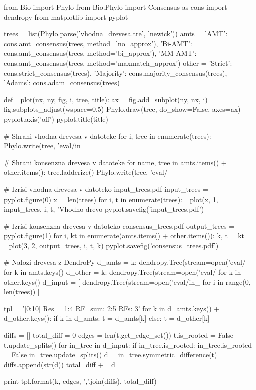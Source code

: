 \documentclass[a4paper, 12pt]{book}
\begin{document}
\begin{python}
from Bio import Phylo
from Bio.Phylo import Consensus as cons
import dendropy
from matplotlib import pyplot

trees = list(Phylo.parse('vhodna_drevesa.tre', 'newick'))
amts = {
    'AMT': cons.amt_consensus(trees, method='no_approx'),
    'Bi-AMT': cons.amt_consensus(trees, method='bi_approx'),
    'MM-AMT': cons.amt_consensus(trees, method='maxmatch_approx')
}
other = {
    'Strict': cons.strict_consensus(trees),
    'Majority': cons.majority_consensus(trees),
    'Adams': cons.adam_consensus(trees)
}

def _plot(nx, ny, fig, i, tree, title):
    ax = fig.add_subplot(ny, nx, i)
    fig.subplots_adjust(wspace=0.5)
    Phylo.draw(tree, do_show=False, axes=ax)
    pyplot.axis('off')
    pyplot.title(title)

# Shrani vhodna drevesa v datoteke
for i, tree in enumerate(trees):
    Phylo.write(tree, 'eval/in_%

# Shrani konsenzna drevesa v datoteke
for name, tree in amts.items() + other.items():
    tree.ladderize()
    Phylo.write(tree, 'eval/%

# Izrisi vhodna drevesa v datoteko input_trees.pdf
input_trees = pyplot.figure(0)
x = len(trees)
for i, t in enumerate(trees):
    _plot(x, 1, input_trees, i, t, 'Vhodno drevo %
pyplot.savefig('input_trees.pdf')

# Izrisi konsenzna drevesa v datoteko consensus_trees.pdf
output_trees = pyplot.figure(1)
for i, kt in enumerate(amts.items() + other.items()):
    k, t = kt
    _plot(3, 2, output_trees, i, t, k)
pyplot.savefig('consensus_trees.pdf')

# Nalozi drevesa z DendroPy
d_amts = {
    k: dendropy.Tree(stream=open('eval/%
    for k in amts.keys()
}
d_other = {
    k: dendropy.Tree(stream=open('eval/%
    for k in other.keys()
}
d_input = [
    dendropy.Tree(stream=open('eval/in_%
    for i in range(0, len(trees))
]

tpl = '[{0:10}] Res = {1:4} RF_sum: {2:5} RFs: {3}'
for k in d_amts.keys() + d_other.keys():
    if k in d_amts:
        t = d_amts[k]
    else:
        t = d_other[k]

    diffs = []
    total_diff = 0
    edges = len(t.get_edge_set())
    t.is_rooted = False
    t.update_splits()
    for in_tree in d_input:
        if in_tree.is_rooted:
            in_tree.is_rooted = False
            in_tree.update_splits()
        d = in_tree.symmetric_difference(t)
        diffs.append(str(d))
        total_diff += d

    print tpl.format(k, edges, ','.join(diffs), total_diff)
\end{python}
\end{document}
